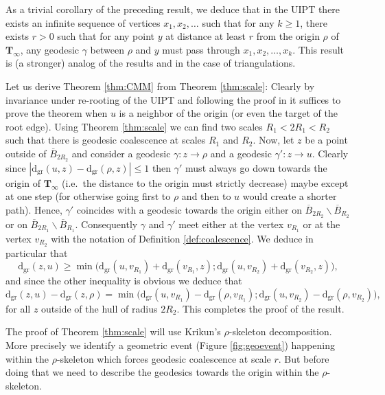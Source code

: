 \documentclass[10pt]{amsart}
\theoremstyle{definition}\newtheorem{defi}[theo]{Definition}\newtheorem{rema}[theo]{Remark}\newtheorem{exam}[theo]{Example}\newtheorem{exem}[theo]{Example}\newtheorem{nota}[theo]{Notation}
\begin{document}
\begin{remark}
As a trivial corollary of the preceding result, we deduce that in the UIPT there exists an infinite sequence of vertices $x_{1},x_{2}, \dots$ such that for any $k \geq 1$, there exists $r>0$ such that for any point $y$ at distance at least $r$ from the origin $\rho$ of $\mathbf{T}_{\infty}$, any geodesic $\gamma$ between $\rho$ and $y$ must pass through $x_{1},x_{2}, \dots , x_{k}$. This result is (a stronger) analog of the results \cite[Lemma 3.3]{CMM10} and \cite[Theorem 3.4]{CMM10} in the case of triangulations.
\end{remark}
Let us derive Theorem \ref{thm:CMM} from Theorem \ref{thm:scale}:
  Clearly by invariance under re-rooting of the UIPT and following the proof in \cite{CMM10} it suffices to prove the theorem when $u$ is a neighbor of the origin (or even the target of the root edge). Using Theorem \ref{thm:scale} we can find two scales $R_{1}< 2 R_{1} < R_{2}$ such that there is geodesic coalescence at scales $R_{1}$ and $R_{2}$. Now, let $z$ be a point outside of $\overline{B}_{2R_{2}}$ and consider a geodesic $\gamma : z \to \rho$ and a geodesic $\gamma' : z \to u$. Clearly since $ |\mathrm{d_{gr}}(u,z) - \mathrm{d_{gr}}(\rho,z)| \leq 1$ then $\gamma'$ must always go down towards the origin of $\mathbf{T}_{\infty}$ (i.e.~the distance to the origin must strictly decrease) maybe except at one step (for otherwise going first to $\rho$ and then to $u$ would create a shorter path). Hence, $\gamma'$ coincides with a geodesic towards the origin either on $ \overline{B}_{2R_{2}} \backslash \overline{B}_{R_{2}}$ or on $ \overline{B}_{2R_{1}} \backslash \overline{B}_{R_{1}}$. Consequently $\gamma$ and $\gamma'$ meet either at the vertex $v_{R_{1}}$ or at the vertex $v_{R_{2}}$ with the notation of Definition \ref{def:coalescence}. We deduce in particular that
$$ \mathrm{d_{gr}}(z, u) \geq \min \big( \mathrm{d_{gr}}(u,v_{R_{1}}) + \mathrm{d_{gr}}(v_{R_{1}},z) ; \mathrm{d_{gr}}(u,v_{R_{2}}) + \mathrm{d_{gr}}(v_{R_{2}},z)\big),$$
 and since the other inequality is obvious we deduce that
 $$ \mathrm{d_{gr}}(z,u)-\mathrm{d_{gr}}(z,\rho) = \min \big( \mathrm{d_{gr}}(u,v_{R_{1}})- \mathrm{d_{gr}}(\rho,v_{R_{1}}) ; \mathrm{d_{gr}}(u,v_{R_{2}})- \mathrm{d_{gr}}(\rho,v_{R_{2}})\big),$$ for all $z$ outside of the hull of radius $2R_{2}$. This completes the proof of the result. \endproof

	

The proof of Theorem \ref{thm:scale} will use Krikun's $\rho$-skeleton decomposition. More precisely we identify a geometric event (Figure \ref{fig:geoevent}) happening within the $\rho$-skeleton which forces geodesic coalescence at scale $r$. But before doing that we need to describe the geodesics towards the origin within the $\rho$-skeleton.
\end{document}
